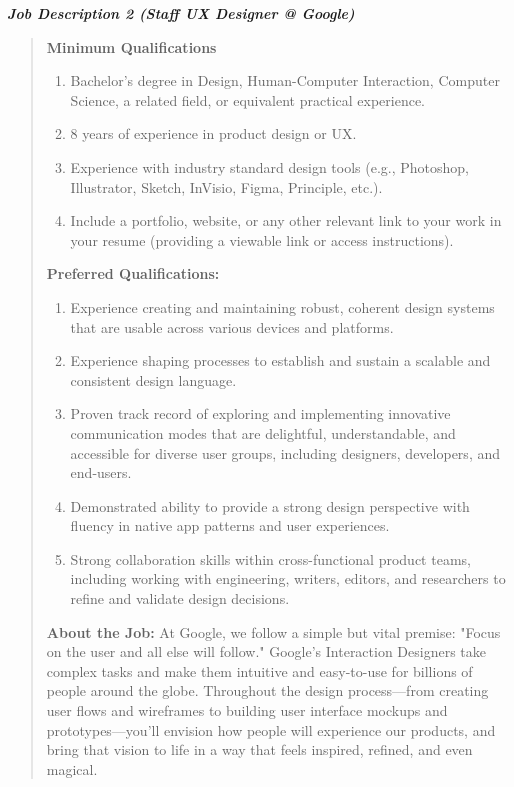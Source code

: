 \textbf{\textit{Job Description 2 (Staff UX Designer @ Google)}}
\begin{quote}
    \textbf{Minimum Qualifications}
    \begin{enumerate}
        \item Bachelor's degree in Design, Human-Computer Interaction, Computer Science, a related field, or equivalent practical experience.
        \item 8 years of experience in product design or UX.
        \item Experience with industry standard design tools (e.g., Photoshop, Illustrator, Sketch, InVisio, Figma, Principle, etc.).
        \item Include a portfolio, website, or any other relevant link to your work in your resume (providing a viewable link or access instructions).
    \end{enumerate}
    
    \textbf{Preferred Qualifications:}
    \begin{enumerate}
        \item Experience creating and maintaining robust, coherent design systems that are usable across various devices and platforms.
        \item Experience shaping processes to establish and sustain a scalable and consistent design language.
        \item Proven track record of exploring and implementing innovative communication modes that are delightful, understandable, and accessible for diverse user groups, including designers, developers, and end-users.
        \item Demonstrated ability to provide a strong design perspective with fluency in native app patterns and user experiences.
        \item Strong collaboration skills within cross-functional product teams, including working with engineering, writers, editors, and researchers to refine and validate design decisions.
    \end{enumerate}
    
    \textbf{About the Job:}
    At Google, we follow a simple but vital premise: "Focus on the user and all else will follow." Google’s Interaction Designers take complex tasks and make them intuitive and easy-to-use for billions of people around the globe. Throughout the design process—from creating user flows and wireframes to building user interface mockups and prototypes—you’ll envision how people will experience our products, and bring that vision to life in a way that feels inspired, refined, and even magical.
    

\end{quote}
